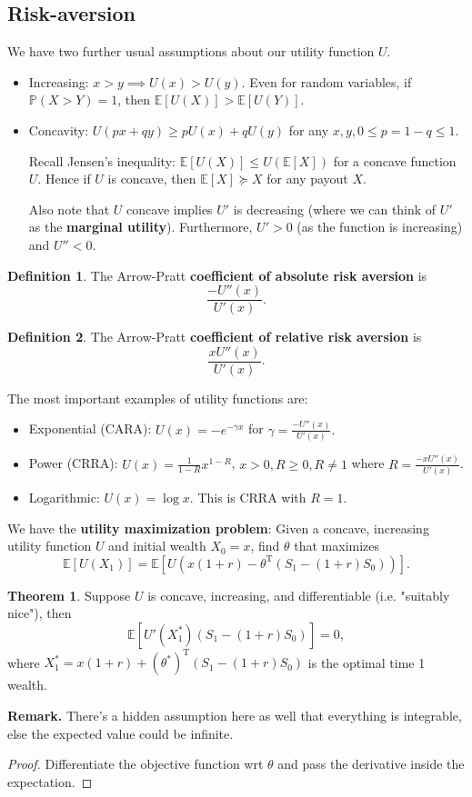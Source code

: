 \documentclass{article}
\theoremstyle{definition}
\newtheorem{theorem}{Theorem}[section]
\newtheorem{defn}{Definition}[section]
\begin{document}
\subsection{Risk-aversion}
We have two further usual assumptions about our utility function $U$.
\begin{itemize}
    \item Increasing: $x>y \implies U(x)>U(y)$. Even for random variables, if $\mathbb{P}(X>Y)=1$, then $\mathbb{E}[U(X)] > \mathbb{E}[U(Y)]$.
    \item Concavity: $U(px+qy) \ge p U(x) + q U(y)$ for any $x,y, 0\le p = 1-q \le 1$.
    \vspace{1mm}

    Recall Jensen's inequality: $\mathbb{E}[U(X)] \le U(\mathbb{E}[X])$ for a concave function $U$. Hence if $U$ is concave, then $\mathbb{E}[X] \succeq X$ for any payout $X$. 
    \vspace{1mm}
    
    Also note that $U$ concave implies $U'$ is decreasing (where we can think of $U'$ as the \textbf{marginal utility}). Furthermore, $U' > 0$ (as the function is increasing) and $U'' < 0$.
\end{itemize}
\begin{defn}
    The Arrow-Pratt \textbf{coefficient of absolute risk aversion } is $$\frac{-U''(x)}{U'(x)}.$$
\end{defn}
\begin{defn}
    The Arrow-Pratt \textbf{coefficient of relative risk aversion} is \[
    \frac{xU''(x)}{U'(x)}.
    \] 
\end{defn}
The most important examples of utility functions are:
\begin{itemize}
    \item Exponential (CARA): $U(x) = -e^{-\gamma x}$ for $\gamma = \frac{-U''(x)}{U'(x)}.$
    \item Power (CRRA): $U(x) = \frac{1}{1-R}x^{1-R}$, $x>0, R\ge 0, R\neq1$ where $R=\frac{-xU''(x)}{U'(x)}$.
    \item Logarithmic: $U(x)= \log x$. This is CRRA with $R=1$.
\end{itemize}

We have the \textbf{utility maximization problem}: Given a concave, increasing utility function $U$ and initial wealth $X_0=x$, find $\theta$ that maximizes $$\mathbb{E}[U(X_1)] = \mathbb{E}[U(x(1+r)-\theta^{\text{T}}(S_1-(1+r)S_0))].$$

\begin{theorem}
    Suppose $U$ is concave, increasing, and differentiable (i.e. "suitably nice"), then $$\mathbb{E}[U'(X_1^*)(S_1-(1+r)S_0)] = 0,$$ where $X_1^* = x(1+r) + (\theta^*)^{\text{T}}(S_1-(1+r)S_0)$ is the optimal time 1 wealth.
\end{theorem}
\textbf{Remark.} There's a hidden assumption here as well that everything is integrable, else the expected value could be infinite. 
\begin{proof}
    Differentiate the objective function wrt $\theta$ and pass the derivative inside the expectation.
\end{proof}
\end{document}
